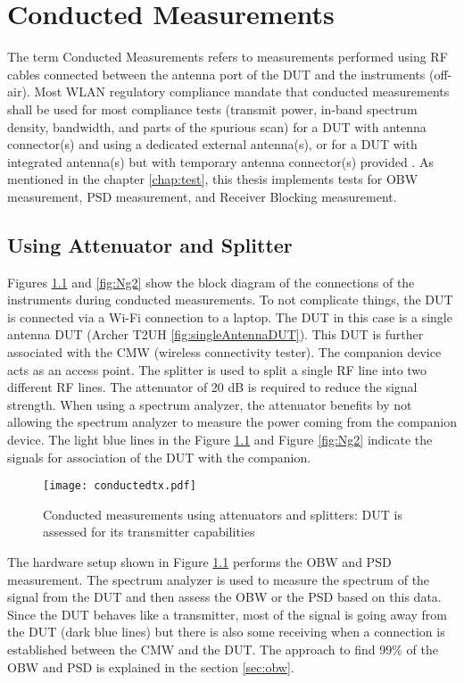 \chapter{Conducted Measurements} \label{chap:5}

The term Conducted Measurements refers to measurements performed using \acs{RF} cables connected between the antenna port of the \acs{DUT} and the instruments (off-air). Most \acs{WLAN} regulatory compliance mandate that conducted measurements shall be used for most compliance tests (transmit power, in-band spectrum density, bandwidth, and parts of the spurious scan) for a \acs{DUT} with antenna connector(s) and using a dedicated external antenna(s), or for a \acs{DUT} with integrated antenna(s) but with temporary antenna connector(s) provided \cite{conducted}. As mentioned in the chapter \ref{chap:test}, this thesis implements tests for \acf{OBW} measurement, \acf{PSD} measurement, and Receiver Blocking measurement.

\section{Using Attenuator and Splitter}
\label{sec:att}
Figures \ref{fig:Ng1} and \ref{fig:Ng2} show the block diagram of the connections of the instruments during conducted measurements. To not complicate things, the \acs{DUT} is connected via a Wi-Fi\texttrademark{} connection to a laptop. The \acs{DUT} in this case is a single antenna \acs{DUT} (Archer T2UH \ref{fig:singleAntennaDUT}). This \acs{DUT} is further associated with the \ac{CMW} (wireless connectivity tester). The companion device acts as an access point. The splitter is used to split a single \acs{RF} line into two different \acs{RF} lines. The attenuator of 20 dB is required to reduce the signal strength. When using a spectrum analyzer, the attenuator benefits by not allowing the spectrum analyzer to measure the power coming from the companion device. The light blue lines in the Figure \ref{fig:Ng1} and Figure \ref{fig:Ng2} indicate the signals for association of the \acs{DUT} with the companion.
\begin{figure}[H]
\centering
\texttt{[image: conductedtx.pdf]}
\vspace{-1.2cm}  \caption{Conducted measurements using attenuators and splitters: \acs{DUT} is assessed for its transmitter capabilities}
 \label{fig:Ng1} 
\end{figure}

The hardware setup shown in Figure \ref{fig:Ng1} performs the \acf{OBW} and \acf{PSD} measurement. The spectrum analyzer is used to measure the spectrum of the signal from the \acs{DUT} and then assess the \acf{OBW} or the \acf{PSD} based on this data. Since the \acs{DUT} behaves like a transmitter, most of the signal is going away from the \acs{DUT} (dark blue lines) but there is also some receiving when a connection is established between the \acf{CMW} and the \acs{DUT}. The approach to find 99\% of the \acf{OBW} and \acf{PSD} is explained in the section \ref{sec:obw}.

